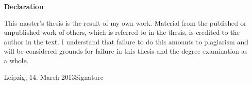 \documentclass[%
  parskip=half,
  ]{scrreprt} %
\begin{document}
\listoffigures
\listoftables

\clearpage
\pagestyle{empty}
\vspace*{1cm}
\begin{center}
\textbf{\sffamily Declaration}
\end{center}
\vspace*{0.5cm}
This master's thesis is the result of my own work. Material from the published or unpublished work of others, which is referred to in the thesis, is credited to the author in the text. I understand that failure to do this amounts to plagiarism and will be considered grounds for failure in this thesis and the degree examination as a whole.

\vspace{2cm}
\noindent
Leipzig, 14. March 2013\hfill Signature
\end{document}
